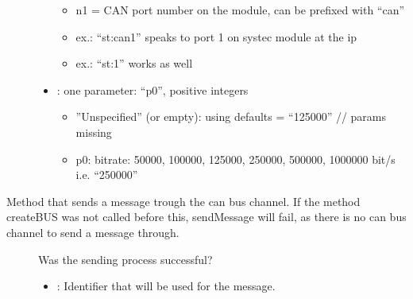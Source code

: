 \documentclass[letterpaper,10pt,english]{sphinxmanual}
\begin{document}
\begin{fulllineitems}
\begin{fulllineitems}
\begin{description}
\begin{itemize}
\begin{itemize}
\item {} 
n1 = CAN port number on the module, can be prefixed with “can”

\item {} 
ex.: “st:can1” speaks to port 1 on systec module at the ip

\item {} 
ex.: “st:1” works as well

\end{itemize}


\item {} 
: one parameter: “p0”, positive integers\begin{itemize}
\item {} 
”Unspecified” (or empty): using defaults = “125000” // params missing

\item {} 
p0: bitrate: 50000, 100000, 125000, 250000, 500000, 1000000 bit/s i.e. “250000”

\end{itemize}


\end{itemize}

\end{description}


\end{fulllineitems}


\begin{fulllineitems}
\label{\detokenize{vendors/systec:_CPPv4N9STCanScan11sendMessageEshPhb}}%
\pysigstartmultiline
{}\label{\detokenize{vendors/systec:classSTCanScan_1a45f0ec011022bf58a23e8370bac7f829}}%
\pysigstopmultiline
Method that sends a message trough the can bus channel. If the method createBUS was not called before this, sendMessage will fail, as there is no can bus channel to send a message through.

\begin{description}
\item[{}] \leavevmode
Was the sending process successful? 

\item[{}] \leavevmode\begin{itemize}
\item {} 
: Identifier that will be used for the message. 


\end{itemize}
\end{description}
\end{fulllineitems}
\end{fulllineitems}
\end{document}
